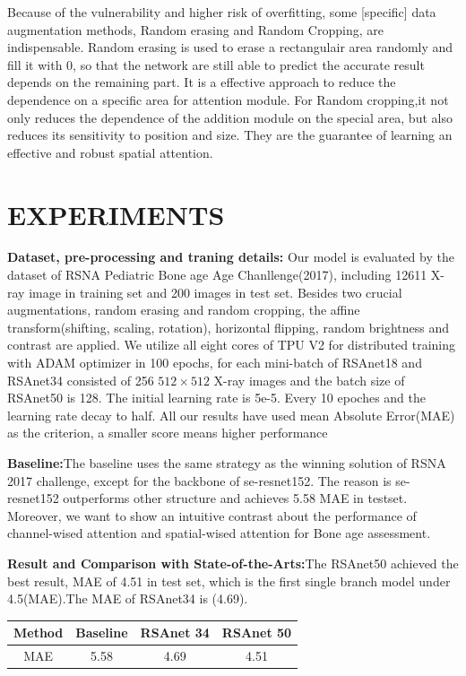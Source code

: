 \documentclass{article}
\begin{document}
Because of the vulnerability and higher risk of overfitting, some [specific] data augmentation methods, Random erasing\cite{zhong2020random} and Random Cropping, are indispensable. Random erasing is used to erase a rectangulair area randomly and fill it with 0, so that the network are still able to predict the accurate result depends on the remaining part. It is a effective approach to reduce the dependence on a specific area for attention module. For Random cropping,it not only reduces the dependence of the addition module on the special area, but also reduces its sensitivity to position and size. They are the guarantee of learning an effective and robust spatial attention.

\section{EXPERIMENTS}
\label{sec:pagestyle}
\textbf{Dataset, pre-processing and traning details:}
Our model is evaluated by the dataset of RSNA Pediatric Bone age Age Chanllenge(2017), including 12611 X-ray image in training set and 200 images in test set. Besides two crucial augmentations, random erasing and random cropping, the affine transform(shifting, scaling, rotation), horizontal flipping, random brightness and contrast are applied. We utilize all eight cores of TPU V2 for distributed training with ADAM optimizer in 100 epochs, for each mini-batch of RSAnet18 and RSAnet34 consisted of 256 $512\times512$ X-ray images and the batch size of RSAnet50 is 128. The initial learning rate is 5e-5. Every 10 epoches and the learning rate decay to half. All our results have used mean Absolute Error(MAE) as the criterion, a smaller score means higher performance

\textbf{Baseline:}The baseline uses the same strategy as the winning solution of RSNA 2017 challenge, except for the backbone of se-resnet152. The reason is se-resnet152 outperforms other structure and achieves 5.58 MAE in testset. Moreover, we want to show an intuitive contrast about the performance of channel-wised attention and spatial-wised attention for Bone age assessment.

\textbf{Result and Comparison with State-of-the-Arts:}The RSAnet50 achieved the best result, MAE of 4.51 in test set,  which is the first single branch model under 4.5(MAE).The MAE of RSAnet34 is (4.69).

\begin{table}[!htbp]
\begin{minipage}[b]{1.0\linewidth}
  \centering
\begin{tabular}{c|c|c|c}
\hline
Method & Baseline & RSAnet 34 & RSAnet 50 \\
\hline
MAE & 5.58 & 4.69 & 4.51\\
\hline
\end{tabular}
\end{minipage}

\end{table}
\end{document}
